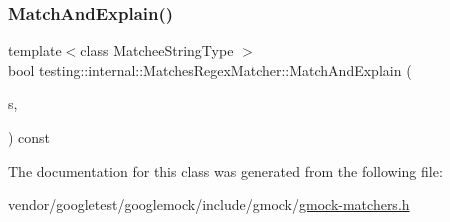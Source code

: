\subsubsection{\texorpdfstring{Match\+And\+Explain()}{MatchAndExplain()}\hspace{0.1cm}{\footnotesize\ttfamily [2/2]}}
{\footnotesize\ttfamily template$<$class Matchee\+String\+Type $>$ \\
bool testing\+::internal\+::\+Matches\+Regex\+Matcher\+::\+Match\+And\+Explain (\begin{DoxyParamCaption}\item[{const Matchee\+String\+Type \&}]{s,  }\item[{\hyperlink{classtesting_1_1_match_result_listener}{Match\+Result\+Listener} $\ast$}]{ }\end{DoxyParamCaption}) const\hspace{0.3cm}{\ttfamily [inline]}}



The documentation for this class was generated from the following file\+:\begin{DoxyCompactItemize}
\item 
vendor/googletest/googlemock/include/gmock/\hyperlink{gmock-matchers_8h}{gmock-\/matchers.\+h}\end{DoxyCompactItemize}
